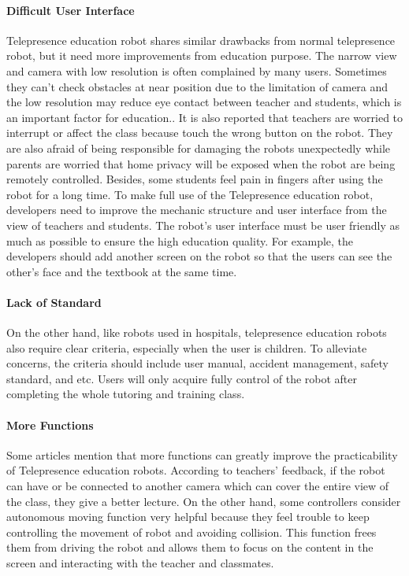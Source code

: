 \documentclass[a4paper]{article}
\begin{document}
\paragraph{Difficult User Interface}
    Telepresence education robot shares similar drawbacks from normal telepresence robot, but it need more improvements from education purpose. The narrow view and camera with low resolution is often complained by many users\cite{58}. Sometimes they can't check obstacles at near position due to the limitation of camera and the low resolution may reduce eye contact between teacher and students, which is an important factor for education.\cite{59}.  It is also reported that teachers are worried to interrupt or affect the class because touch the wrong button on the robot. They are also afraid of being responsible for damaging the robots unexpectedly while parents are worried that home privacy will be exposed when the robot are being remotely controlled. Besides, some students feel pain in fingers after using the robot for a long time\cite{60}. To make full use of the Telepresence education robot, developers need to improve the mechanic structure and user interface from the view of teachers and students.  The robot's user interface must be user friendly as much as possible to ensure the high education quality. For example, the developers should add another screen on the robot so that the users can see the other's face and the textbook at the same time.
\paragraph{Lack of Standard}  
    On the other hand, like robots used in hospitals, telepresence education robots also require clear criteria, especially when the user is children. To alleviate concerns, the criteria should include user manual, accident management, safety standard, and etc. Users will only acquire fully control of the robot after completing the whole tutoring and training class.
\paragraph{More Functions}
    Some articles mention that more functions can greatly improve the practicability of Telepresence education robots. According to teachers' feedback, if the robot can have or be connected to another camera which can cover the entire view of the class, they give a better lecture. On the other hand, some controllers consider autonomous moving function very helpful because they feel trouble to keep controlling the movement of robot and avoiding collision. This function frees them from driving the robot and allows them to focus on the content in the screen and interacting with the teacher and classmates.
\end{document}
